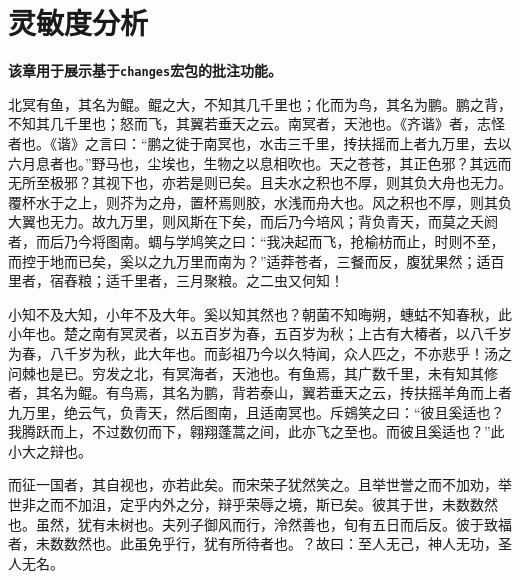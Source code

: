 
\section{灵敏度分析}

{\bf 该章用于展示基于\verb|changes|宏包的批注功能。}

北冥有鱼，其名为鲲。鲲之大，不知其几千里也；化而为鸟，其名为鹏。鹏之背，不知其几千里也；怒而飞，其翼若垂天之云。南冥者，天池也。《齐谐》者，志怪者也。《谐》之言曰：“鹏之徙于南冥也，水击三千里，抟扶摇而上者九万里，去以六月息者也。”野马也，尘埃也，生物之以息相吹也。天之苍苍，其正色邪？其远而无所至极邪？其视下也，亦若是则已矣。且夫水之积也不厚，则其负大舟也无力。覆杯水于之上，则芥为之舟，置杯焉则胶，水浅而舟大也。风之积也不厚，则其负大翼也无力。故九万里，则风斯在下矣，而后乃今培风；背负青天，而莫之夭阏者，而后乃今将图南。蜩与学鸠笑之曰：“我决起而飞，抢榆枋而止，时则不至，而控于地而已矣，奚以之九万里而南为？”适莽苍者，三餐而反，腹犹果然；适百里者，宿舂粮；适千里者，三月聚粮。之二虫又何知！

小知不及大知，小年不及大年。奚以知其然也？朝菌不知晦朔，蟪蛄不知春秋，此小年也。楚之南有冥灵者，以五百岁为春，五百岁为秋；上古有大椿者，以八千岁为春，八千岁为秋，此大年也。而彭祖乃今以久特闻，众人匹之，不亦悲乎！汤之问棘也是已。穷发之北，有冥海者，天池也。有鱼焉，其广数千里，未有知其修者，其名为鲲。有鸟焉，其名为鹏，背若泰山，翼若垂天之云，抟扶摇羊角而上者九万里，绝云气，负青天，然后图南，且适南冥也。斥鴳笑之曰：“彼且奚适也？我腾跃而上，不过数仞而下，翱翔蓬蒿之间，此亦飞之至也。而彼且奚适也？”此小大之辩也。

而征一国者，其自视也，亦若此矣。而宋荣子犹然笑之。且举世誉之而不加劝，举世非之而不加沮，定乎内外之分，辩乎荣辱之境，斯已矣。彼其于世，未数数然也。虽然，犹有未树也。夫列子御风而行，泠然善也，旬有五日而后反。彼于致福者，未数数然也。此虽免乎行，犹有所待者也。？故曰：至人无己，神人无功，圣人无名。

\iffalse
只能用这个命令
来实现多行注释
\fi

